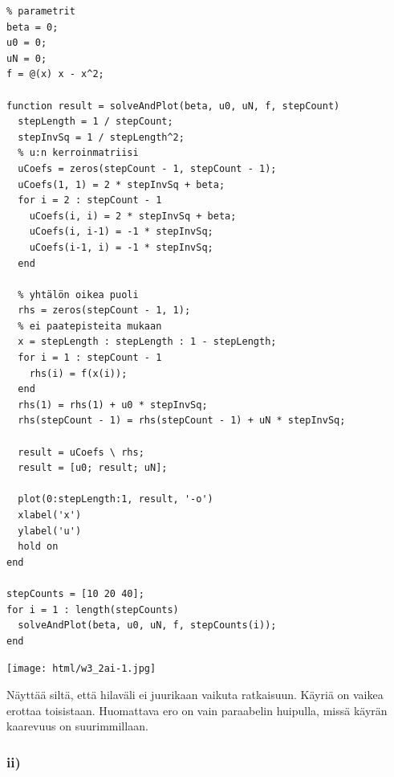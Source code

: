 \documentclass{article}
\begin{document}
\begin{verbatim}
% parametrit
beta = 0;
u0 = 0;
uN = 0;
f = @(x) x - x^2;

function result = solveAndPlot(beta, u0, uN, f, stepCount)
  stepLength = 1 / stepCount;
  stepInvSq = 1 / stepLength^2;
  % u:n kerroinmatriisi
  uCoefs = zeros(stepCount - 1, stepCount - 1);
  uCoefs(1, 1) = 2 * stepInvSq + beta;
  for i = 2 : stepCount - 1
    uCoefs(i, i) = 2 * stepInvSq + beta;
    uCoefs(i, i-1) = -1 * stepInvSq;
    uCoefs(i-1, i) = -1 * stepInvSq;
  end

  % yhtälön oikea puoli
  rhs = zeros(stepCount - 1, 1);
  % ei paatepisteita mukaan
  x = stepLength : stepLength : 1 - stepLength;
  for i = 1 : stepCount - 1
    rhs(i) = f(x(i));
  end
  rhs(1) = rhs(1) + u0 * stepInvSq;
  rhs(stepCount - 1) = rhs(stepCount - 1) + uN * stepInvSq;

  result = uCoefs \ rhs;
  result = [u0; result; uN];

  plot(0:stepLength:1, result, '-o')
  xlabel('x')
  ylabel('u')
  hold on
end

stepCounts = [10 20 40];
for i = 1 : length(stepCounts)
  solveAndPlot(beta, u0, uN, f, stepCounts(i));
end
\end{verbatim}

\begin{center}
\texttt{[image: html/w3\_2ai-1.jpg]}
\end{center}

Näyttää siltä, että hilaväli ei juurikaan vaikuta ratkaisuun.
Käyriä on vaikea erottaa toisistaan. Huomattava ero on vain paraabelin
huipulla, missä käyrän kaarevuus on suurimmillaan.

\subsubsection*{ii)}
\end{document}
